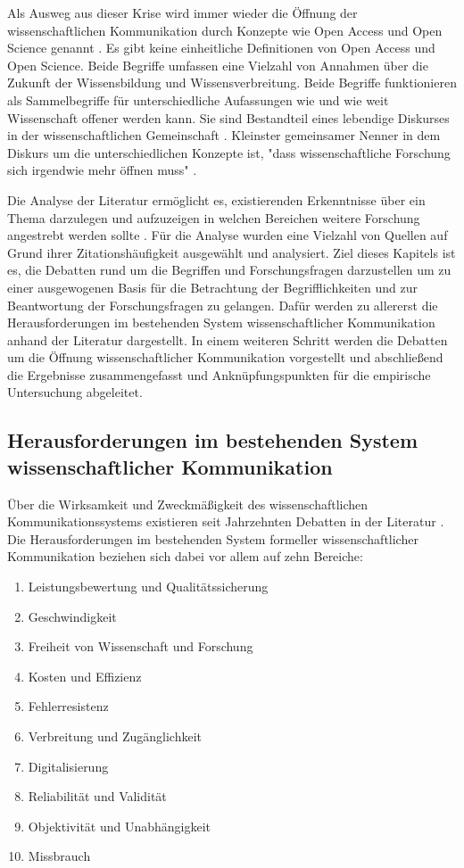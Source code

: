 Als Ausweg aus dieser Krise wird immer wieder die Öffnung der wissenschaftlichen Kommunikation durch Konzepte wie Open Access und Open Science genannt \cite{suchen}. Es gibt keine einheitliche Definitionen von Open Access und Open Science. Beide Begriffe umfassen eine Vielzahl von Annahmen über die Zukunft der Wissensbildung und Wissensverbreitung. Beide Begriffe funktionieren als Sammelbegriffe für unterschiedliche Aufassungen wie und wie weit Wissenschaft offener werden kann. Sie sind Bestandteil eines lebendige Diskurses in der wissenschaftlichen Gemeinschaft \cite{schulze_2013_open}. Kleinster gemeinsamer Nenner in dem Diskurs um die unterschiedlichen Konzepte ist, "dass wissenschaftliche Forschung sich irgendwie mehr öffnen muss" \cite{cite:9}.

Die Analyse der Literatur ermöglicht es, existierenden Erkenntnisse über ein Thema darzulegen und aufzuzeigen in welchen Bereichen weitere Forschung angestrebt werden sollte \cite{webster2002analyzing}. Für die Analyse wurden eine Vielzahl von Quellen auf Grund ihrer Zitationshäufigkeit ausgewählt und analysiert. Ziel dieses Kapitels ist es, die Debatten rund um die Begriffen und Forschungsfragen darzustellen um zu einer ausgewogenen Basis für die Betrachtung der Begrifflichkeiten und zur Beantwortung der Forschungsfragen zu gelangen. Dafür werden zu allererst die Herausforderungen im bestehenden System wissenschaftlicher Kommunikation anhand der Literatur dargestellt. In einem weiteren Schritt werden die Debatten um die Öffnung wissenschaftlicher Kommunikation vorgestellt und abschließend die Ergebnisse zusammengefasst und Anknüpfungspunkten für die empirische Untersuchung abgeleitet.

\subsection{Herausforderungen im bestehenden System wissenschaftlicher Kommunikation}

Über die Wirksamkeit und Zweckmäßigkeit des wissenschaftlichen Kommunikationssystems existieren seit Jahrzehnten Debatten in der Literatur \cite{suchen}. Die Herausforderungen im bestehenden System formeller wissenschaftlicher Kommunikation beziehen sich dabei vor allem auf zehn Bereiche:
\begin{enumerate}
\item Leistungsbewertung und Qualitätssicherung
\item Geschwindigkeit
\item Freiheit von Wissenschaft und Forschung
\item Kosten und Effizienz
\item Fehlerresistenz
\item Verbreitung und Zugänglichkeit
\item Digitalisierung
\item Reliabilität und Validität
\item Objektivität und Unabhängigkeit
\item Missbrauch
\end{enumerate}

